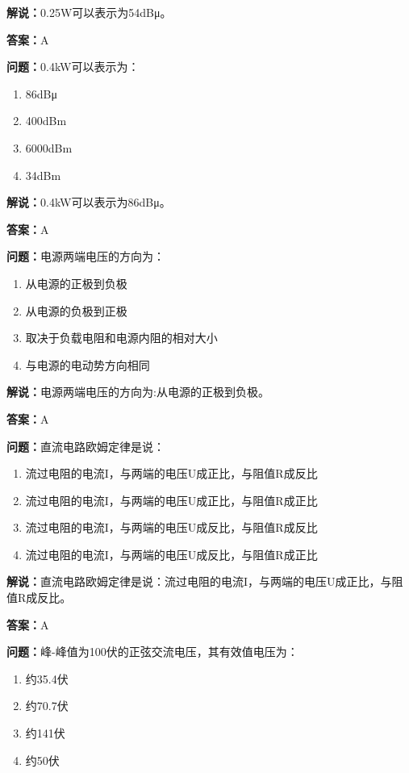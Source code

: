 \documentclass[UTF8]{ctexbook}
\begin{document}
\textbf{解说：}0.25W可以表示为54dBμ。%

\textbf{答案：}A

\textbf{问题：}0.4kW可以表示为：

\begin{enumerate}[label=\Alph*), leftmargin=3em]
  \item 86dBμ
  \item 400dBm
  \item 6000dBm
  \item 34dBm
\end{enumerate}

\textbf{解说：}0.4kW可以表示为86dBμ。%

\textbf{答案：}A

\textbf{问题：}电源两端电压的方向为：

\begin{enumerate}[label=\Alph*), leftmargin=3em]
  \item 从电源的正极到负极
  \item 从电源的负极到正极
  \item 取决于负载电阻和电源内阻的相对大小
  \item 与电源的电动势方向相同
\end{enumerate}

\textbf{解说：}电源两端电压的方向为:从电源的正极到负极。

\textbf{答案：}A

\textbf{问题：}直流电路欧姆定律是说：

\begin{enumerate}[label=\Alph*), leftmargin=3em]
  \item 流过电阻的电流I，与两端的电压U成正比，与阻值R成反比
  \item 流过电阻的电流I，与两端的电压U成正比，与阻值R成正比
  \item 流过电阻的电流I，与两端的电压U成反比，与阻值R成反比
  \item 流过电阻的电流I，与两端的电压U成反比，与阻值R成正比
\end{enumerate}

\textbf{解说：}直流电路欧姆定律是说：流过电阻的电流I，与两端的电压U成正比，与阻值R成反比。%

\textbf{答案：}A

\textbf{问题：}峰-峰值为100伏的正弦交流电压，其有效值电压为：

\begin{enumerate}[label=\Alph*), leftmargin=3em]
  \item 约35.4伏
  \item 约70.7伏
  \item 约141伏
  \item 约50伏
\end{enumerate}
\end{document}
